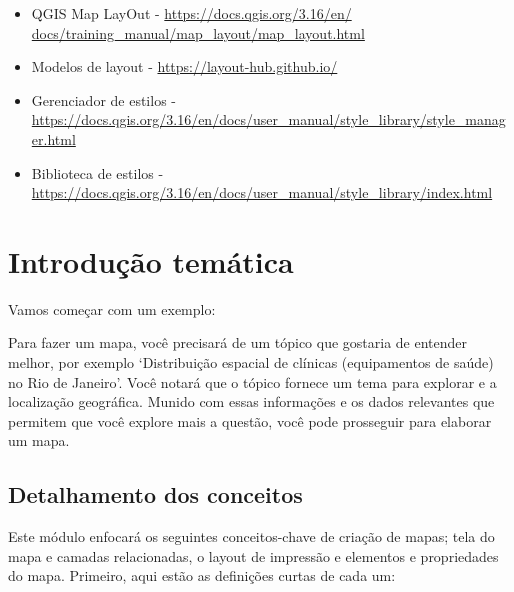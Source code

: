\documentclass[
  portuguese,
]{krantz}
\providecommand{\tightlist}{%
  \setlength{\itemsep}{0pt}\setlength{\parskip}{0pt}}
\begin{document}
\begin{itemize}
\tightlist
\item
  QGIS Map LayOut - \href{https://docs.qgis.org/3.16/en/docs/training_manual/map_layout/map_layout.html}{https://docs.qgis.org/3.16/en/ docs/training\_manual/map\_layout/map\_layout.html}
\item
  Modelos de layout - \url{https://layout-hub.github.io/}
\item
  Gerenciador de estilos - \url{https://docs.qgis.org/3.16/en/docs/user_manual/style_library/style_manager.html}
\item
  Biblioteca de estilos - \url{https://docs.qgis.org/3.16/en/docs/user_manual/style_library/index.html}
\end{itemize}

\hypertarget{introduuxe7uxe3o-temuxe1tica-4}{%
\section{Introdução temática}\label{introduuxe7uxe3o-temuxe1tica-4}}

Vamos começar com um exemplo:

Para fazer um mapa, você precisará de um tópico que gostaria de entender melhor, por exemplo `Distribuição espacial de clínicas (equipamentos de saúde) no Rio de Janeiro'. Você notará que o tópico fornece um tema para explorar e a localização geográfica. Munido com essas informações e os dados relevantes que permitem que você explore mais a questão, você pode prosseguir para elaborar um mapa.

\hypertarget{detalhamento-dos-conceitos-1}{%
\subsection{Detalhamento dos conceitos}\label{detalhamento-dos-conceitos-1}}

Este módulo enfocará os seguintes conceitos-chave de criação de mapas; tela do mapa e camadas relacionadas, o layout de impressão e elementos e propriedades do mapa. Primeiro, aqui estão as definições curtas de cada um:
\end{document}
